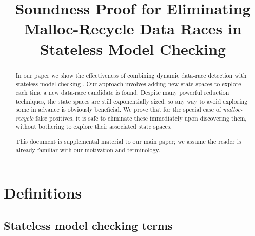 \documentclass[pldi]{sigplanconf-pldi15}
\begin{document}
%
%

\newcommand\landslide{\textsc{Landslide}}
\newcommand\quicksand{\textsc{Quicksand}}
\newcommand\simics{\textsc{Simics}}
\newcommand{\sect}[1]{\S #1}
\newcommand\hilight[2]{\color{#1}#2\color{black}}

\newcommand\numthrlibs{79}
\newcommand\numpintoses{79}
\newcommand\numstudence{158} %

\title{Soundness Proof for Eliminating Malloc-Recycle Data Races in Stateless Model Checking}

\maketitle
\begin{abstract}
In our paper we show the effectiveness of combining dynamic data-race detection \cite{eraser,hybriddatarace} with stateless model checking \cite{verisoft,dpor}.
Our approach involves adding new state spaces to explore each time a new data-race candidate is found.
Despite many powerful reduction techniques, the state spaces are still exponentially sized,
so any way to avoid exploring some in advance is obviously beneficial.
We prove that for the special case of {\em malloc-recycle} false positives, it is safe to eliminate these immediately upon discovering them, without bothering to explore their associated state spaces.


This document is supplemental material to our main paper; we assume the reader is already familiar with our motivation and terminology.
\end{abstract}


\section{Definitions}

\subsection{Stateless model checking terms}
\end{document}
